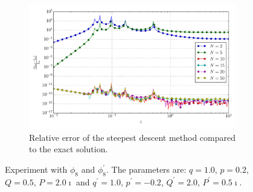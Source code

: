 \documentclass[a4paper,10pt]{article}
\begin{document}
\begin{figure}[ht!]
\begin{subfigure}[t]{0.5\linewidth}
    \includegraphics[width=\linewidth]{./plots/tp_1d_conv_eps_8_8_err_rel_nsd.pdf}
    \caption{Relative error of the steepest descent method compared to the exact solution.}
    \label{fig:tp_1d_conv_eps_8_8_err_rel_nsd}
  \end{subfigure}
  \label{fig:tp_1d_conv_eps_8_8}
  \caption{Experiment with $\phi_{8}$ and $\phi_{8}^{\prime}$.
  The parameters are:
  $q=1.0$, $p=0.2$, $Q=0.5$, $P=2.0\imath$ and
  $q^\prime=1.0$, $p^\prime=-0.2$, $Q^\prime=2.0$, $P^\prime=0.5\imath$.}
\end{figure}
\end{document}

